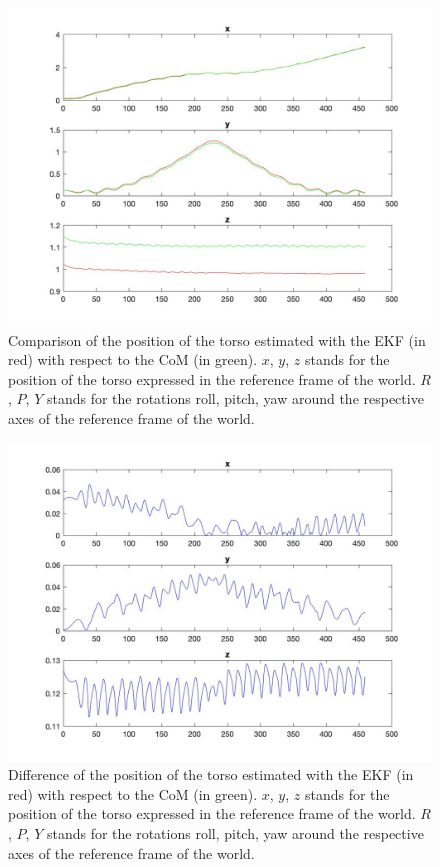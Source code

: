 \documentclass[a4paper]{article}
\begin{document}
\begin{figure}
    \centering
    \includegraphics[width=\textwidth]{images/comp_estimated_torso_com.jpg}
    \caption{Comparison of the position of the torso
        estimated
        with the EKF (in red) with respect to the CoM (in green). $x$, $y$, $z$ stands for the position
        of the torso expressed in the reference frame of the
        world. $R$, $P$, $Y$ stands for the rotations roll,
        pitch, yaw around the respective axes of the
        reference frame of the world.}
    \label{fig:comp_estimated_torso_com}
\end{figure}

\begin{figure}
    \centering
    \includegraphics[width=\textwidth]{images/diff_estimated_torso_com.jpg}
    \caption{Difference of the position of the torso
        estimated
        with the EKF (in red) with respect to the CoM (in
        green). $x$, $y$, $z$ stands for the position
        of the torso expressed in the reference frame of the
        world. $R$, $P$, $Y$ stands for the rotations roll,
        pitch, yaw around the respective axes of the
        reference frame of the world.}
    \label{fig:diff_estimated_torso_com}
\end{figure}
\end{document}
